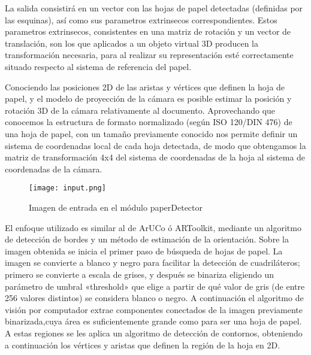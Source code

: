 La salida consistirá en un vector con las hojas de papel detectadas (definidas por las esquinas), así como sus parametros extrinsecos correspondientes. Estos parametros extrinsecos, consistentes en una matriz de rotación y un vector de translación, son los que aplicados a un objeto virtual 3D producen la transformación necesaria, para al realizar su representación esté correctamente situado respecto al sistema de referencia del papel.   



Conociendo las posiciones 2D de las aristas y vértices que definen la hoja de papel, y el modelo de proyección de la cámara es posible estimar la posición y rotación 3D de la cámara relativamente al documento. Aprovechando que conocemos la estructura de formato normalizado (según ISO 120/DIN 476) de una hoja de papel, con un tamaño previamente conocido nos permite definir un sistema de coordenadas local de cada hoja detectada, de modo que obtengamos la matriz de transformación 4x4 del sistema de coordenadas de la hoja al sistema de coordenadas de la cámara.

\begin{figure}[h] 
  \centering
  \texttt{[image: input.png]}
  \caption{Imagen de entrada en el módulo paperDetector}
  \label{fig:input}
\end{figure}

El enfoque utilizado es similar al de ArUCo ó ARToolkit, mediante un algoritmo de detección de bordes y un método de estimación de la orientación. Sobre la imagen obtenida se inicia el primer paso de búsqueda de hojas de papel. La imagen se convierte a blanco y negro para facilitar la detección de cuadriláteros; primero se convierte a escala de grises, y después se binariza eligiendo un parámetro de umbral «threshold» que elige a partir de qué valor de gris (de entre 256 valores distintos) se considera blanco o negro. A continuación el algoritmo de visión por computador extrae componentes conectados de la imagen previamente binarizada,cuya área es suficientemente grande como para ser una hoja de papel. A estas regiones se les aplica un algoritmo de detección de contornos, obteniendo a continuación los vértices y aristas que definen la región de la hoja en 2D.




